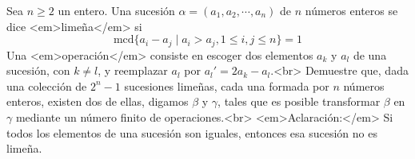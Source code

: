 Sea $n \geq 2$ un entero. Una sucesión $\alpha = (a_1, a_2, \cdots , a_n)$ de $n$ números enteros se dice <em>limeña</em> si
\[ \textrm{mcd}\{ a_i - a_j \mid a_i > a_j, 1 \leq i,j \leq n \} = 1 \]
Una <em>operación</em> consiste en escoger dos elementos $a_k$ y $a_l$ de una sucesión, con $k \neq l$, y reemplazar $a_l$ por $a_l' = 2a_k - a_l$.<br>
Demuestre que, dada una colección de $2^n-1$ sucesiones limeñas, cada una formada por $n$ números enteros, existen dos de ellas, digamos $\beta$ y $\gamma$, tales que es posible transformar $\beta$ en $\gamma$ mediante un número finito de operaciones.<br>
<em>Aclaración:</em> Si todos los elementos de una sucesión son iguales, entonces esa sucesión no es limeña.
